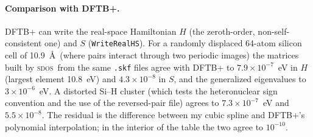 \documentclass[reprint,nofootinbib,superscriptaddress,amsmath,amssymb,aps,prb,floatfix]{revtex4-2}
\newcommand{\sdos}{\textsc{sdos}}
\begin{document}
\paragraph*{Comparison with DFTB+.}
DFTB+ \cite{dftbplus} can write the real-space Hamiltonian $H$ (the zeroth-order, non-self-consistent one) and $S$ (\texttt{WriteRealHS}).
For a randomly displaced 64-atom silicon cell of 10.9~\AA\ (where pairs interact through two periodic images) the matrices built by \sdos\ from the same \texttt{.skf} files agree with DFTB+ to $7.9\times10^{-7}$~eV in $H$ (largest element 10.8~eV) and $4.3\times10^{-8}$ in $S$, and the generalized eigenvalues to $3\times10^{-6}$~eV.
A distorted Si--H cluster (which tests the heteronuclear sign convention and the use of the reversed-pair file) agrees to $7.3\times10^{-7}$~eV and $5.5\times10^{-8}$.
The residual is the difference between my cubic spline and DFTB+'s polynomial interpolation; in the interior of the table the two agree to $10^{-10}$.
\end{document}
